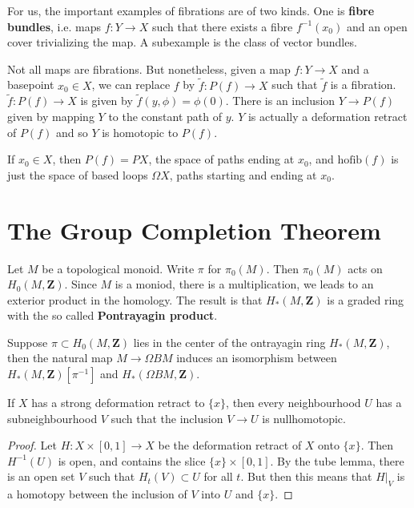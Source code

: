 \begin{example}
    For us, the important examples of fibrations are of two kinds. One is {\bf fibre bundles}, i.e. maps $f: Y \to X$ such that there exists a fibre $f^{-1}(x_0)$ and an open cover trivializing the map. A subexample is the class of vector bundles.
\end{example}

Not all maps are fibrations. But nonetheless, given a map $f:Y \to X$ and a basepoint $x_0 \in X$, we can replace $f$ by $\tilde{f}: P(f) \to X$ such that $\tilde{f}$ is a fibration. $\tilde{f}: P(f) \to X$ is given by $\tilde{f}(y,\phi) = \phi(0)$. There is an inclusion $Y \to P(f)$ given by mapping $Y$ to the constant path of $y$. $Y$ is actually a deformation retract of $P(f)$ and so $Y$ is homotopic to $P(f)$.

\begin{example}
    If $x_0 \in X$, then $P(f) = PX$, the space of paths ending at $x_0$, and $\text{hofib}(f)$ is just the space of based loops $\Omega X$, paths starting and ending at $x_0$.
\end{example}

\section{The Group Completion Theorem}

Let $M$ be a topological monoid. Write $\pi$ for $\pi_0(M)$. Then $\pi_0(M)$ acts on $H_0(M,\mathbf{Z})$. Since $M$ is a moniod, there is a multiplication, we leads to an exterior product in the homology. The result is that $H_*(M,\mathbf{Z})$ is a graded ring with the so called {\bf Pontrayagin product}.

\begin{theorem}
    Suppose $\pi \subset H_0(M,\mathbf{Z})$ lies in the center of the ontrayagin ring $H_*(M,\mathbf{Z})$, then the natural map $M \to \Omega BM$ induces an isomorphism between $H_*(M,\mathbf{Z})[\pi^{-1}]$ and $H_*(\Omega BM, \mathbf{Z})$.
\end{theorem}













\begin{theorem}
    If $X$ has a strong deformation retract to $\{ x \}$, then every neighbourhood $U$ has a subneighbourhood $V$ such that the inclusion $V \to U$ is nullhomotopic.
\end{theorem}
\begin{proof}
    Let $H: X \times [0,1] \to X$ be the deformation retract of $X$ onto $\{ x \}$. Then $H^{-1}(U)$ is open, and contains the slice $\{ x \} \times [0,1]$. By the tube lemma, there is an open set $V$ such that $H_t(V) \subset U$ for all $t$. But then this means that $H|_V$ is a homotopy between the inclusion of $V$ into $U$ and $\{ x \}$.
\end{proof}

